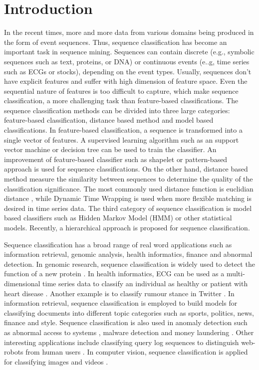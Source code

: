 \documentclass{amia}
\begin{document}
\section*{Introduction}
In the recent times, more and more data from various domains being produced in the form of event sequences. Thus, sequence classification has become an important task in sequence mining. Sequences can contain discrete (e.g., symbolic sequences such as text, proteins, or DNA) or continuous events (e..g, time series such as ECGs or stocks), depending on the event types. Usually, sequences don't have explicit features and suffer with high dimension of feature space. Even the sequential nature of features is too difficult to capture, which make sequence classification, a more challenging task than feature-based classifications. The sequence classification methods can be divided into three large categories: feature-based classification, distance based method and model based classifications. In feature-based classification, a sequence is transformed into a single vector of features. A supervised learning algorithm such as an support vector machine \cite{leslie2004fast} or decision tree \cite{chuzhanova1998feature} can be used to train the classifier. An improvement of feature-based classifier such as shapelet \cite{ye2009time} or pattern-based \cite{kudenko1998feature, lesh1999mining} approach is used for sequence classifications. On the other hand, distance based method measure the similarity between sequences to determine the quality of the classification significance. The most commonly used distance function is euclidian distance \cite{keogh2003need}, while Dynamic Time Wrapping \cite{keogh2000scaling} is used when more flexible matching is desired in time series data. The third category of sequence classification is model based classifiers such as Hidden Markov Model \cite{rabiner1989tutorial} (HMM) or other statistical models. Recently, a hierarchical approach \cite{nallam2016effective} is proposed for sequence classification. 

Sequence classification has a broad range of real word applications such as information retrieval, genomic analysis, health informatics, finance and abnormal detection. In genomic research, sequence classification is widely used to detect the function of a new protein \cite{deshpande2002evaluation}. In health informatics, ECG can be used as a multi-dimensional time series data to classify an individual as healthy or patient with heart disease \cite{wei2006semi}. Another example is to classify rumour stance in Twitter \cite{lukasik2016hawkes}. In information retrieval, sequence classification is employed to build  models for classifying documents into different topic categories \cite{sebastiani2002machine} such as sports, politics, news, finance and style. Sequence classification is also used in anomaly detection such as abnormal access to systems \cite{lane1999temporal}, malware detection \cite{drew2017polymorphic} and money laundering \cite{liu2008sequence}. Other interesting applications include classifying query log sequences to distinguish web-robots from human users \cite{duskin2009distinguishing, tan2004discovery}. In computer vision, sequence classification is applied for classifying images \cite{li2000image} and videos \cite{zhang2016tensor}.    
\end{document}
